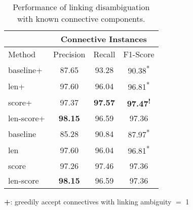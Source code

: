 \begin{table}[ht]
\centering
\begin{tabular}{|l|c|c|c|}
\hline
                        & \multicolumn{3}{c|}{Connective Instances}                 \\ \hline
Method                  &     Precision &     Recall &     F1-Score                 \\ \hline
baseline+               &     87.65     &     93.28  &     90.38\textsuperscript{*} \\ \hline
len+                    &     97.60     &     96.04  &     96.81\textsuperscript{*} \\ \hline
score+                  &     97.37     & \bf 97.57  & \bf 97.47\textsuperscript{!} \\ \hline
len-score+              & \bf 98.15     &     96.59  &     97.36\textsuperscript{ } \\


\hhline{|=|=|=|=|}

baseline                &     85.28     &     90.84  &     87.97\textsuperscript{*} \\ \hline
len                     &     97.60     &     96.04  &     96.81\textsuperscript{*} \\ \hline
score                   &     97.26     &     97.46  &     97.36\textsuperscript{ } \\ \hline
len-score               & \bf 98.15     &     96.59  &     97.36\textsuperscript{ } \\ \hline

\end{tabular}
\begin{flushleft}
\small
\textbf{+}: greedily accept connectives with linking ambiguity $=$ 1
\end{flushleft}
\caption{\label{t:linking-perfect-methods} Performance of linking
disambiguation with known connective components. }
\end{table}

